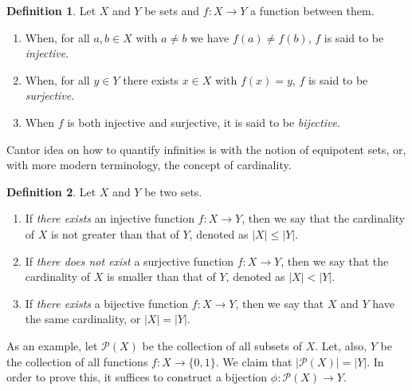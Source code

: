 \documentclass[a4paper]{article}
\theoremstyle{definition}
\newtheorem{defn}{Definition}
\begin{document}
\begin{defn}
    Let $X$ and $Y$ be sets and $f\colon X \to Y$ a function between them. 
    \begin{enumerate}
        \item When, for all $a,b \in X$ with $a \ne b$ we have $f(a) \ne f(b)$, $f$ is said to be \emph{injective}.
        \item When, for all $y \in Y$ there exists $x \in X$ with $f(x) = y$, $f$ is said to be \emph{surjective}.
        \item When $f$ is both injective and surjective, it is said to be \emph{bijective}.
    \end{enumerate}
\end{defn}

Cantor idea on how to quantify infinities is with the notion of equipotent sets, or, with more modern terminology, the concept of cardinality.

\begin{defn}
    Let $X$ and $Y$ be two sets.
    \begin{enumerate}
        \item If \emph{there exists} an injective function $f\colon X \to Y$, then we say that the cardinality of $X$ is not greater than that of $Y$, denoted as $|X| \le |Y|$.
        \item If \emph{there does not exist} a surjective function $f\colon X \to Y$, then we say that the cardinality of $X$ is smaller than that of $Y$, denoted as $|X| < |Y|$.
        \item If \emph{there exists} a bijective function $f\colon X \to Y$, then we say that $X$ and $Y$ have the same cardinality, or $|X| = |Y|$.
    \end{enumerate}
\end{defn}

As an example, let $\mathcal{P}(X)$ be the collection of all subsets of $X$. Let, also, $Y$ be the collection of all functions $f\colon X \to \{0,1\}$. We claim that $|\mathcal{P}(X)| = |Y|$. In order to prove this, it suffices to construct a bijection $\phi \colon \mathcal{P}(X) \to Y$. 
\end{document}
